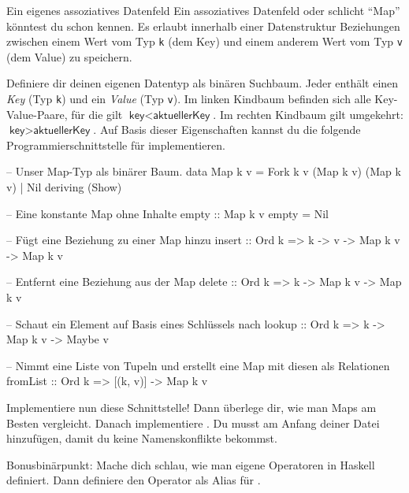 \documentclass{uebblatt}
\begin{document}
\begin{aufgabe}{Ein eigenes assoziatives Datenfeld}
Ein assoziatives Datenfeld oder schlicht "`Map"' könntest du schon kennen. Es erlaubt innerhalb einer Datenstruktur Beziehungen zwischen einem Wert vom Typ \verb|k| (dem Key) und einem anderem Wert vom Typ \verb|v| (dem Value) zu speichern.

Definiere dir deinen eigenen Datentyp  als binären Suchbaum. Jeder  enthält einen \emph{Key} (Typ \verb|k|) und ein \emph{Value} (Typ \verb|v|). Im linken Kindbaum befinden sich alle Key-Value-Paare, für die gilt $\textsf{key} < \textsf{aktuellerKey}$. Im rechten Kindbaum gilt umgekehrt: $\textsf{key} > \textsf{aktuellerKey}$. Auf Basis dieser Eigenschaften kannst du die folgende Programmierschnittstelle für  implementieren.

\begin{haskellcode}
-- Unser Map-Typ als binärer Baum.
data Map k v = Fork k v (Map k v) (Map k v)
             | Nil deriving (Show)

-- Eine konstante Map ohne Inhalte
empty :: Map k v
empty = Nil

-- Fügt eine Beziehung zu einer Map hinzu
insert :: Ord k => k -> v -> Map k v -> Map k v

-- Entfernt eine Beziehung aus der Map
delete :: Ord k => k -> Map k v -> Map k v

-- Schaut ein Element auf Basis eines Schlüssels nach
lookup :: Ord k => k -> Map k v -> Maybe v

-- Nimmt eine Liste von Tupeln und erstellt eine Map mit diesen als Relationen
fromList :: Ord k => [(k, v)] -> Map k v
\end{haskellcode}

Implementiere nun diese Schnittstelle! Dann überlege dir, wie man Maps am Besten vergleicht. Danach implementiere . Du musst  am Anfang deiner Datei hinzufügen, damit du keine Namenskonflikte bekommst.

Bonusbinärpunkt: Mache dich schlau, wie man eigene Operatoren in Haskell definiert. Dann definiere den Operator \haskellinline{!} als Alias für .
\end{aufgabe}
\end{document}

